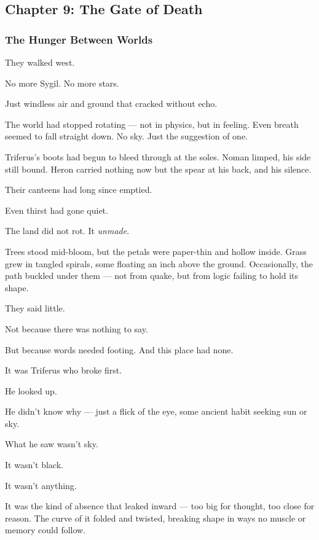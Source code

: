 \documentclass[12pt]{article}
\begin{document}
\newpage

\subsection*{Chapter 9: The Gate of Death}

\vspace{.5in}

\subsubsection*{The Hunger Between Worlds}

They walked west.

No more Sygil. No more stars.

Just windless air and ground that cracked without echo.

The world had stopped rotating — not in physics, but in feeling. Even breath seemed to fall straight down. No sky. Just the suggestion of one.

Triferus’s boots had begun to bleed through at the soles. Noman limped, his side still bound. Heron carried nothing now but the spear at his back, and his silence.

Their canteens had long since emptied.

Even thirst had gone quiet.

\bigskip

The land did not rot. It \textit{unmade}.

Trees stood mid-bloom, but the petals were paper-thin and hollow inside. Grass grew in tangled spirals, some floating an inch above the ground. Occasionally, the path buckled under them — not from quake, but from logic failing to hold its shape.

They said little.

Not because there was nothing to say.

But because words needed footing. And this place had none.

\bigskip

It was Triferus who broke first.

He looked up.

He didn’t know why — just a flick of the eye, some ancient habit seeking sun or sky.

What he saw wasn’t sky.

It wasn’t black.

It wasn’t anything.

It was the kind of absence that leaked inward — too big for thought, too close for reason. The curve of it folded and twisted, breaking shape in ways no muscle or memory could follow.
\end{document}
